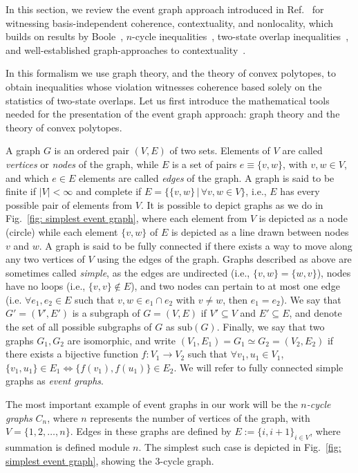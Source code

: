\documentclass[a4paper,twocolumn,11pt,accepted=2024-01-17]{quantumarticle}
\begin{document}
{ In this section, we review the} event graph approach introduced in Ref.~\cite{wagner2022inequalities} for witnessing basis-independent coherence, contextuality, and nonlocality, which builds on  results by Boole~\cite{Boole1854}, $n$-cycle inequalities~\cite{araujo2013all},  two-state overlap inequalities~\cite{galvaobroad2020quantumandclassical}, and well-established graph-approaches to contextuality~\cite{amaral2018graph,cabello2014graph}. {In this formalism we use graph theory, and the theory of convex polytopes, to obtain inequalities whose violation witnesses coherence based solely on the statistics of two-state overlaps. Let us first introduce the mathematical tools needed for the presentation of the event graph approach: graph theory and the theory of convex polytopes. 

A graph $G$ is an ordered pair $(V,E)$ of two sets. Elements of $V$ are called \textit{vertices} or \textit{nodes} of the graph, while  $E$ is a set of pairs $e \equiv \{v,w\}$, with $v,w \in V$, and which  $e \in E$ elements are called \textit{edges} of the graph. A graph is said to be finite if $|V|<\infty$ and complete if $E = \{\{v,w\}\,|\, \forall v,w \in V\}$, i.e., $E$ has every possible pair of elements from $V$. It is possible to depict graphs as we do in Fig.~\ref{fig: simplest event graph}, where each element from $V$ is depicted as a node (circle) while each element $\{v,w\}$ of $E$ is depicted as a line drawn between nodes $v$ and $w$. A graph is said to be fully connected if there exists a way to move along any two vertices of $V$ using the edges of the graph. Graphs described as above are sometimes called \textit{simple}, as the edges are undirected (i.e., $\{v,w\} = \{w,v\}$), nodes have no loops (i.e., $\{v,v\} \notin E$), and two nodes can pertain to at most one edge (i.e. $\forall e_1,e_2 \in E$ such that  $v,w \in e_1 \cap e_2$ with $v \neq w$, then $e_1 = e_2$). We say that $G' = (V',E')$ is a subgraph of $G = (V,E)$ if $V' \subseteq V$ and $E' \subseteq E$, and denote the set of all possible subgraphs of $G$ as $\text{sub}(G)$. Finally, we say that two graphs $G_1,G_2$ are isomorphic, and write $(V_1,E_1) = G_1 \simeq G_2 = (V_2,E_2)$ if there exists a bijective function $f: V_1 \to V_2$ such that $\forall v_1,u_1 \in V_1$, $\{v_1,u_1\} \in E_1 \iff \{f(v_1),f(u_1)\} \in E_2$.  We will refer to fully connected simple graphs as \textit{event graphs}.}

{ The most important example of event graphs in our work will be the \textit{$n$-cycle graphs} $C_n$, where $n$ represents the number of vertices of the graph, with $V = \{1,2,\dots,n\}$. Edges in these graphs are defined by $E := \{i,i+1\}_{i \in V}$, where summation is defined module $n$. The simplest such case is depicted in Fig.~\ref{fig: simplest event graph}, showing the $3$-cycle graph. }
\end{document}
